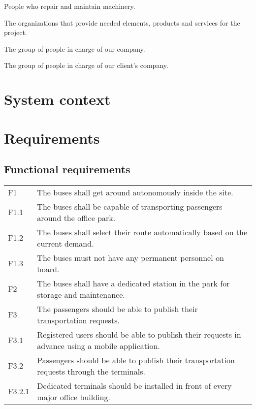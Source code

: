 \documentclass[a4paper]{article}
\begin{document}
\begin{description}[align=right,leftmargin=6cm,style=multiline]
	\item[mechanics]
		People who repair and maintain machinery.

	\item[suppliers]
		The organizations that provide needed elements, products and
		services for the project.

	\item[our company’s management]
		The group of people in charge of our company.

	\item[client's management]
		The group of people in charge of our client's company.
\end{description}



\section{System context}



\section{Requirements}

\subsection{Functional requirements}
\begin{tabular}{l l}
        F1 & The buses shall get around autonomously inside the site. \\
        F1.1 & The buses shall be capable of transporting passengers around the office park. \\
        F1.2 & The buses shall select their route automatically based on the current demand. \\
        F1.3 & The buses must not have any permanent personnel on board. \\
        F2 & The buses shall have a dedicated station in the park for storage and maintenance.\\
        F3 & The passengers should be able to publish their transportation requests.\\
        F3.1 & Registered users should be able to publish their requests in advance using a mobile application.\\
        F3.2 & Passengers should be able to publish their transportation requests through the terminals.\\
        F3.2.1 & Dedicated terminals should be installed in front of every major office building.\\
\end{tabular}
\end{document}
